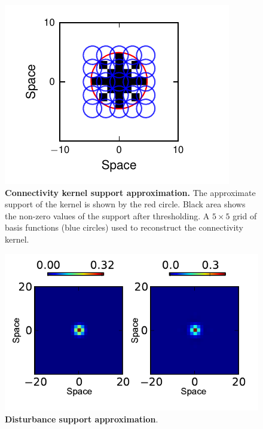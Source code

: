 \documentclass[]{article}
\begin{document}
\begin{figure}[!ht]
\begin{center}
\includegraphics{./Figures/KernelBasis1.pdf}
\end{center}
\caption{{\bf Connectivity kernel support approximation.} The approximate support of the kernel is shown by the red circle. Black area shows the non-zero values of the support after thresholding. A $5\times5$ grid of basis functions (blue circles) used to reconstruct the connectivity kernel.}
\label{fig:KernelWidthEstimation}
\end{figure}
\begin{figure}[!ht]
\begin{center}
\includegraphics{./Figures/DisturbanceWidthEstimation.pdf}
\end{center}
\caption{{\bf Disturbance support approximation}. }
\label{fig:DisturbanceWidthEstimation}
\end{figure}
\end{document}
